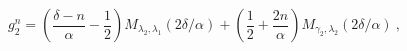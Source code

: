 \begin{equation}
g^{n}_{2}=\left( \frac{\delta-n}{\alpha}-\frac{1}{2}\right)M_{\lambda_2,
\lambda_1}(2\delta/\alpha)+\left(\frac12+\frac{2n}{\alpha}\right)M_{\gamma_2,
\lambda_2}(2\delta/\alpha) \ ,
\label{30}
\end{equation}

